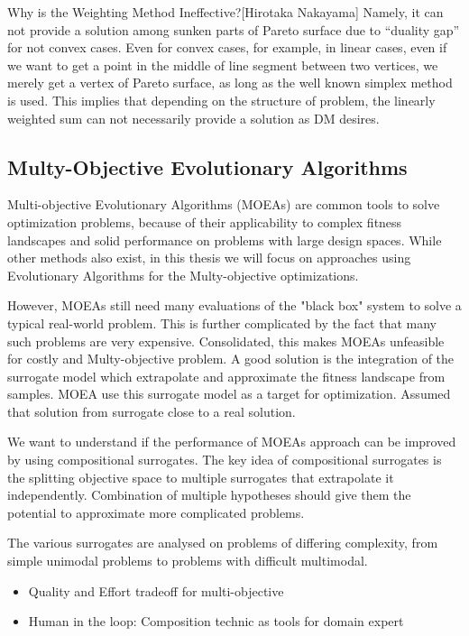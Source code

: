             Why is the Weighting Method Ineffective?[Hirotaka Nakayama]
            Namely, it can not provide a solution among sunken parts of Pareto surface due to “duality gap” for not convex cases. 
            Even for convex cases, for example, in linear cases, even if we want to get a point in the middle of line segment between two vertices, we merely get a vertex of Pareto surface, as
            long as the well known simplex method is used. This implies that depending on the structure of problem, the linearly weighted sum can not necessarily provide a solution as DM desires.


        \subsection{Multy-Objective Evolutionary Algorithms}
            Multi-objective Evolutionary Algorithms (MOEAs) are common tools to solve optimization problems, 
            because of their applicability to complex fitness landscapes and solid performance on problems with large design spaces. 
            While other methods also exist, in this thesis we will focus on approaches using Evolutionary Algorithms for the Multy-objective optimizations.

            However, MOEAs still need many evaluations of the "black box" system to solve a typical real-world problem. 
            This is further complicated by the fact that many such problems are very expensive. Consolidated, this makes MOEAs unfeasible for costly and Multy-objective problem.
            A good solution is the integration of the surrogate model which extrapolate and approximate the fitness landscape from samples. MOEA use this surrogate model 
            as a target for optimization. Assumed that solution from surrogate close to a real solution.
            
            We want to understand if the performance of MOEAs approach can be improved by using compositional surrogates. 
            The key idea of compositional surrogates is the splitting objective space to multiple surrogates that extrapolate it independently. 
            Combination of multiple hypotheses should give them the potential to approximate more complicated problems. 

            The various surrogates are analysed on problems of differing complexity, from simple unimodal problems to problems with difficult multimodal. 

            \begin{itemize}
                \item Quality and Effort tradeoff for multi-objective
                \item Human in the loop: Composition technic as tools for domain expert
            \end{itemize}


